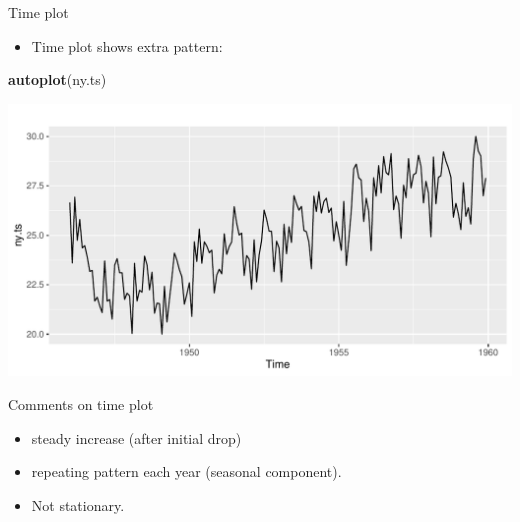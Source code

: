 \documentclass[ignorenonframetext,]{beamer}
\newenvironment{Shaded}{\begin{snugshade}}{\end{snugshade}}
\newcommand{\KeywordTok}[1]{\textcolor[rgb]{0.13,0.29,0.53}{\textbf{#1}}}
\newcommand{\NormalTok}[1]{#1}
\providecommand{\tightlist}{%
  \setlength{\itemsep}{0pt}\setlength{\parskip}{0pt}}
\begin{document}
\begin{frame}[fragile]{Time plot}
\protect\hypertarget{time-plot}{}

\begin{itemize}
\tightlist
\item
  Time plot shows extra pattern:
\end{itemize}

\begin{Shaded}
\begin{Highlighting}[]
\KeywordTok{autoplot}\NormalTok{(ny.ts)}
\end{Highlighting}
\end{Shaded}

\includegraphics{figure/unnamed-chunk-522-1.pdf}

\end{frame}

\begin{frame}{Comments on time plot}
\protect\hypertarget{comments-on-time-plot}{}

\begin{itemize}
\tightlist
\item
  steady increase (after initial drop)
\item
  repeating pattern each year (seasonal component).
\item
  Not stationary.
\end{itemize}

\end{frame}
\end{document}
